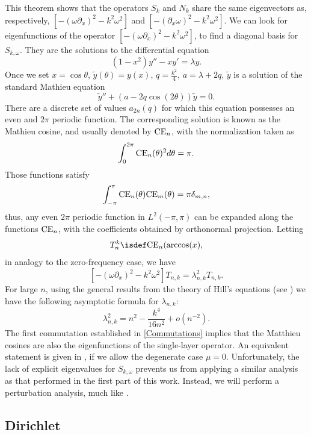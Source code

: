 \documentclass[a4paper]{article}
\begin{document}
This theorem shows that the operators $S_k$ and $N_k$ share the same eigenvectors as, respectively, $\left[-(\omega \partial_x)^2 - k^2\omega^2\right]$ and $ \left[-(\partial_x \omega)^2 - k^2\omega^2\right]$. We can look for eigenfunctions of the operator $\left[ -(\omega \partial_x)^2 - k^2\omega^2\right]$, to find a diagonal basis for $S_{k,\omega}$. They are the solutions to the differential equation 
\[ (1-x^2) y'' - x y' = \lambda y.\]
Once we set $x = \cos \theta$, $\tilde{y}(\theta) = y(x)$,  $q = \frac{k^2}{4}$, $a = \lambda + 2q$, $\tilde{y}$ is a solution of the standard Mathieu equation 
\[\tilde{y}'' + (a - 2q \cos(2\theta)) \tilde{y} = 0.\]
There are a discrete set of values $a_{2n}(q)$ for which this equation possesses an even and $2\pi$ periodic function. The corresponding solution is known as the Mathieu cosine, and usually denoted by $\textup{CE}_n$, with the normalization taken as
\[ \int_{0}^{2\pi} \textup{CE}_n(\theta)^2 d\theta = \pi.\]
Those functions satisfy 
\[ \int_{-\pi}^{\pi}\textup{CE}_n(\theta) \textup{CE}_m(\theta) = \pi \delta_{m,n},\]
thus, any even $2\pi$ periodic function in $L^2(-\pi,\pi)$ can be expanded along the functions $\textup{CE}_n$, with the coefficients obtained by orthonormal projection. Letting 
\[T_{n}^k \isdef \textup{CE}_n(\arccos(x),\]
in analogy to the zero-frequency case, we have
\[\left[-(\omega \partial_x)^2 - k^2\omega^2\right] T_{n,k} = \lambda_{n,k}^2 T_{n,k}.\]
For large $n$, using the general results from the theory of Hill's equations (see \cite[eq. 28.29.21]{NIST:DLMF}) we have the following asymptotic formula for $\lambda_{n,k}$:
\[ \lambda_{n,k}^2 = n^2 - \frac{k^4}{16n^2} +o \left(n^{-2}\right). \]
The first commutation established in \autoref{Commutations} implies that the Matthieu cosines are also the eigenfunctions of the single-layer operator. An equivalent statement is given in \cite[Thm 4.2]{betcke2014spectral}, if we allow the degenerate case $\mu = 0$. Unfortunately, the lack of explicit eigenvalues for $S_{k,\omega}$ prevents us from applying a similar analysis as that performed in the first part of this work. Instead, we will perform a perturbation analysis, much like \cite{bruno2012second}. 

\subsection{Dirichlet}
\end{document}

